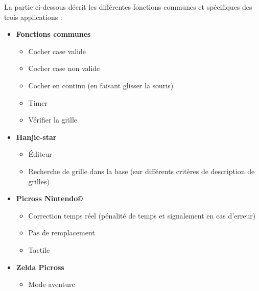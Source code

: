 \documentclass[a4paper, 12pt, twoside]{article}
\begin{document}
La partie ci-dessous décrit les différentes fonctions communes et spécifiques des trois applications : \newline

\begin{itemize}\setlength{\itemsep}{5mm}

  \item[\textbullet] \large\textbf{Fonctions communes\newline}
  
  \begin{itemize}\setlength{\itemsep}{2mm}
  \item Cocher case valide
  \item Cocher case non valide
  \item Cocher en continu (en faisant glisser la souris)
  \item Timer
  \item Vérifier la grille
 \end{itemize}

 \item[\textbullet] \large\textbf{Hanjie-star\newline}
 
 \begin{itemize}\setlength{\itemsep}{2mm}
  \item Éditeur
  \item Recherche de grille dans la base (sur différents critères de description de grilles)
 \end{itemize}

 \item[\textbullet] \large\textbf{Picross Nintendo\copyright\newline}
 
 \begin{itemize}\setlength{\itemsep}{2mm}
  \item Correction temps réel (pénalité de temps et signalement en cas d'erreur)
  \item Pas de remplacement
  \item Tactile
 \end{itemize}

 \item[\textbullet] \large\textbf{Zelda Picross\newline}
 
 \begin{itemize}\setlength{\itemsep}{2mm}
  \item Mode aventure
 \end{itemize}
 
\end{itemize}
\end{document}

